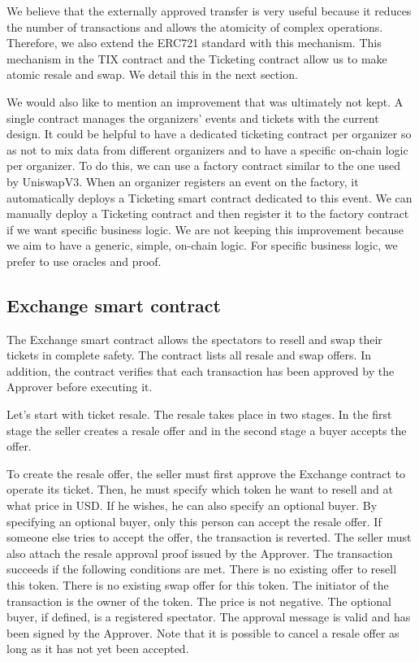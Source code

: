 \documentclass[a4paper,11pt,oneside]{report}
\begin{document}
We believe that the externally approved transfer is very useful because it reduces the number of transactions and allows the atomicity of complex operations. Therefore, we also extend the ERC721 standard with this mechanism. This mechanism in the TIX contract and the Ticketing contract allow us to make atomic resale and swap. We detail this in the next section.

We would also like to mention an improvement that was ultimately not kept. A single contract manages the organizers' events and tickets with the current design. It could be helpful to have a dedicated ticketing contract per organizer so as not to mix data from different organizers and to have a specific on-chain logic per organizer. To do this, we can use a factory contract similar to the one used by UniswapV3. When an organizer registers an event on the factory, it automatically deploys a Ticketing smart contract dedicated to this event. We can manually deploy a Ticketing contract and then register it to the factory contract if we want specific business logic. We are not keeping this improvement because we aim to have a generic, simple, on-chain logic. For specific business logic, we prefer to use oracles and proof.

\subsection{Exchange smart contract}
The Exchange smart contract allows the spectators to resell and swap their tickets in complete safety. The contract lists all resale and swap offers. In addition, the contract verifies that each transaction has been approved by the Approver before executing it.

Let's start with ticket resale. The resale takes place in two stages. In the first stage the seller creates a resale offer and in the second stage a buyer accepts the offer.

To create the resale offer, the seller must first approve the Exchange contract to operate its ticket. Then, he must specify which token he want to resell and at what price in USD. If he wishes, he can also specify an optional buyer. By specifying an optional buyer, only this person can accept the resale offer. If someone else tries to accept the offer, the transaction is reverted. The seller must also attach the resale approval proof issued by the Approver. The transaction succeeds if the following conditions are met. There is no existing offer to resell this token. There is no existing swap offer for this token. The initiator of the transaction is the owner of the token. The price is not negative. The optional buyer, if defined, is a registered spectator. The approval message is valid and has been signed by the Approver. Note that it is possible to cancel a resale offer as long as it has not yet been accepted.
\end{document}
